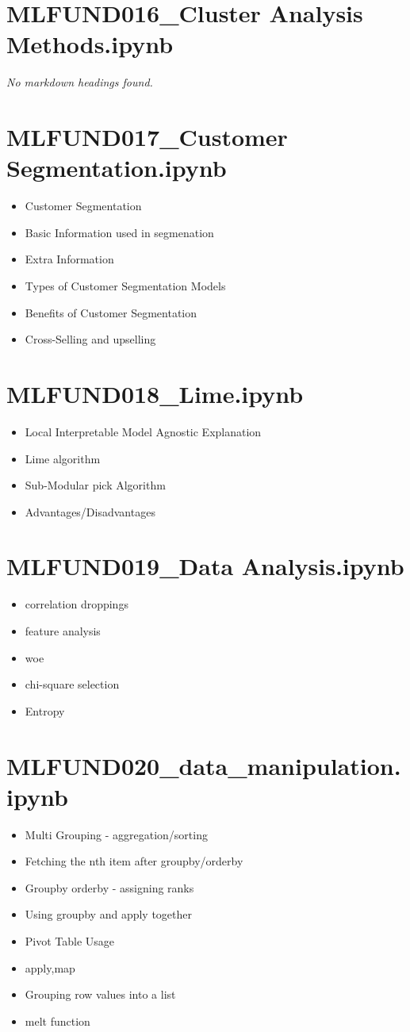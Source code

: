 \documentclass[11pt]{article}
\begin{document}
\section*{MLFUND016\_Cluster Analysis Methods.ipynb}
\textit{No markdown headings found.}
\section*{MLFUND017\_Customer Segmentation.ipynb}
\begin{itemize}
\item Customer Segmentation
\item Basic Information used in segmenation
\item Extra Information
\item Types of Customer Segmentation Models
\item Benefits of Customer Segmentation
\item Cross-Selling and upselling
\end{itemize}
\section*{MLFUND018\_Lime.ipynb}
\begin{itemize}
\item Local Interpretable Model Agnostic Explanation
\item Lime algorithm
\item Sub-Modular pick Algorithm
\item Advantages/Disadvantages
\end{itemize}
\section*{MLFUND019\_Data Analysis.ipynb}
\begin{itemize}
\item correlation droppings
\item feature analysis
\item woe
\item chi-square selection
\item Entropy
\end{itemize}
\section*{MLFUND020\_data\_manipulation.ipynb}
\begin{itemize}
\item Multi Grouping - aggregation/sorting
\item Fetching the nth item after groupby/orderby
\item Groupby orderby - assigning ranks
\item Using groupby and apply together
\item Pivot Table Usage
\item apply,map
\item Grouping row values into a list
\item melt function
\end{itemize}
\end{document}

